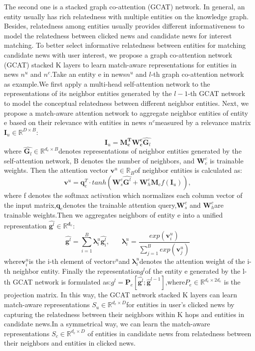 \documentclass[withoutpreface,bwprint]{cumcmthesis} %
\begin{document}
	The second one is a stacked graph co-attention (GCAT) network. In general, an entity usually has rich relatedness with multiple entities on the knowledge graph. Besides, relatedness among entities usually provides different informativeness to model the relatedness between clicked news and candidate news for interest matching. To better select informative relatedness between entities for matching candidate news with user interest, we propose a graph co-attention network (GCAT) stacked K layers to learn match-aware representations for entities in news $ {n}^{u}$ and ${n} ^ {c} $.Take an entity e in news$ {n}^{u} $ and $l$-th graph co-attention network as example.We first apply a multi-head self-attention network to the representations of its neighbor entities generated by the $l-1$-th GCAT network to model the conceptual relatedness between different neighbor entities. Next, we propose a match-aware attention network to aggregate neighbor entities of entity e based on their relevance with entities in news ${n}^{c}$measured by a relevance matrix $ \mathbf{I}_u \in \mathbb{R}^{D \times B} $:
	\begin{equation}
	\mathbf{I}_u = \mathbf{M^T_c} \mathbf{W^c_c} \hat{\mathbf{G}_l}
	\end{equation}
	where $\hat{\mathbf{G}_l} \in \mathbb{R}^{d_e \times B}$denotes representations of neighbor entities generated by the self-attention network, B denotes the number of neighbors, and $\mathbf{W}^c_c$ is trainable weights. Then the attention vector $\mathbf{v}^{u} \in \mathbb{R}_B $of neighbor entities is calculated as:
	\begin{equation}
	\mathbf{v}^{u} = \mathbf{q}^T_e \cdot tanh(\mathbf{W}^c_s \hat{\mathbf{G}^{l}} + \mathbf{W}^c_h \mathbf{M}_c f(\mathbf{I}_u) ), 
	\end{equation}
	where f denotes the softmax activation which normalizes each column vector of the input matrix,$\mathbf{q}_e$denotes the trainable
	attention query,$\mathbf{W}^c_s$ and $\mathbf{W}^c_h$are trainable weights.Then we aggregates neighbors of entity e into a unified representation $\hat{\mathbf{g}^{l}} \in \mathbb{R}^{\mathbf{d}_e}  $:
	\begin{equation}
	\hat{\mathbf{g}^{l}} = \sum_{i=1}^{B}\mathbf{\lambda}^u_i\hat{\mathbf{g}^l_i},{~~~~~~~~}      
	\mathbf{\lambda}^u_i = \frac{exp(\mathbf{v}^u_i)}{\sum_{j=1}^{B}exp(\mathbf{v}^u_j)}
	\end{equation}
	where$\mathbf{v}^u_i$is the i-th element of vector$v^u$and
	$\mathbf{\lambda}^u_i$denotes the attention weight of the i-th neighbor entity. Finally the representation$g^l$of the entity e generated by the l-th GCAT network is formulated as:$g^l = \mathbf{P}_e[\hat{\mathbf{g}^{l}};\hat{\mathbf{g}}^{l-1}]$,where$P_e\in \mathbb{R}^{d_e\times2d_e}$ is the projection matrix. In this way, the GCAT network stacked K layers can learn match-aware representations $S_u \in \mathbb{R}^{d_e \times D}$for entities in user’s clicked news by capturing the relatedness between their neighbors within K hops and entities in candidate news.In a symmetrical way, we can learn the match-aware representations $S_c \in \mathbb{R}^{d_e \times D}$ of entities in candidate news from relatedness between their neighbors and entities in clicked news.
	
\end{document}

